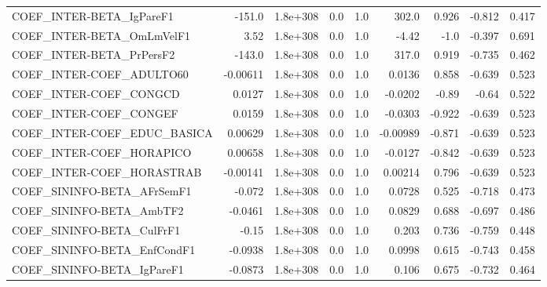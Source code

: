 \begin{tabular}{lrrrrrrrr}
COEF\_INTER-BETA\_IgPareF1              &      -151.0 &     1.8e+308 &     0.0 &      1.0 &      302.0 &       0.926 &       -0.812 &         0.417 \\
COEF\_INTER-BETA\_OmLmVelF1             &        3.52 &     1.8e+308 &     0.0 &      1.0 &      -4.42 &        -1.0 &       -0.397 &         0.691 \\
COEF\_INTER-BETA\_PrPersF2              &      -143.0 &     1.8e+308 &     0.0 &      1.0 &      317.0 &       0.919 &       -0.735 &         0.462 \\
COEF\_INTER-COEF\_ADULTO60              &    -0.00611 &     1.8e+308 &     0.0 &      1.0 &     0.0136 &       0.858 &       -0.639 &         0.523 \\
COEF\_INTER-COEF\_CONGCD                &      0.0127 &     1.8e+308 &     0.0 &      1.0 &    -0.0202 &       -0.89 &        -0.64 &         0.522 \\
COEF\_INTER-COEF\_CONGEF                &      0.0159 &     1.8e+308 &     0.0 &      1.0 &    -0.0303 &      -0.922 &       -0.639 &         0.523 \\
COEF\_INTER-COEF\_EDUC\_BASICA           &     0.00629 &     1.8e+308 &     0.0 &      1.0 &   -0.00989 &      -0.871 &       -0.639 &         0.523 \\
COEF\_INTER-COEF\_HORAPICO              &     0.00658 &     1.8e+308 &     0.0 &      1.0 &    -0.0127 &      -0.842 &       -0.639 &         0.523 \\
COEF\_INTER-COEF\_HORASTRAB             &    -0.00141 &     1.8e+308 &     0.0 &      1.0 &    0.00214 &       0.796 &       -0.639 &         0.523 \\
COEF\_SININFO-BETA\_AFrSemF1            &      -0.072 &     1.8e+308 &     0.0 &      1.0 &     0.0728 &       0.525 &       -0.718 &         0.473 \\
COEF\_SININFO-BETA\_AmbTF2              &     -0.0461 &     1.8e+308 &     0.0 &      1.0 &     0.0829 &       0.688 &       -0.697 &         0.486 \\
COEF\_SININFO-BETA\_CulFrF1             &       -0.15 &     1.8e+308 &     0.0 &      1.0 &      0.203 &       0.736 &       -0.759 &         0.448 \\
COEF\_SININFO-BETA\_EnfCondF1           &     -0.0938 &     1.8e+308 &     0.0 &      1.0 &     0.0998 &       0.615 &       -0.743 &         0.458 \\
COEF\_SININFO-BETA\_IgPareF1            &     -0.0873 &     1.8e+308 &     0.0 &      1.0 &      0.106 &       0.675 &       -0.732 &         0.464 \\

\end{tabular}
